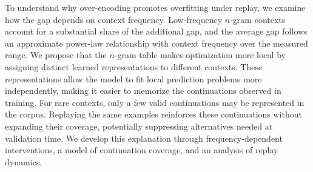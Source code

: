 To understand why over-encoding promotes overfitting under replay, we examine how the gap depends on context frequency. Low-frequency $n$-gram contexts account for a substantial share of the additional gap, and the average gap follows an approximate power-law relationship with context frequency over the measured range. We propose that the $n$-gram table makes optimization more local by assigning distinct learned representations to different contexts. These representations allow the model to fit local prediction problems more independently, making it easier to memorize the continuations observed in training. For rare contexts, only a few valid continuations may be represented in the corpus. Replaying the same examples reinforces these continuations without expanding their coverage, potentially suppressing alternatives needed at validation time. We develop this explanation through frequency-dependent interventions, a model of continuation coverage, and an analysis of replay dynamics.

